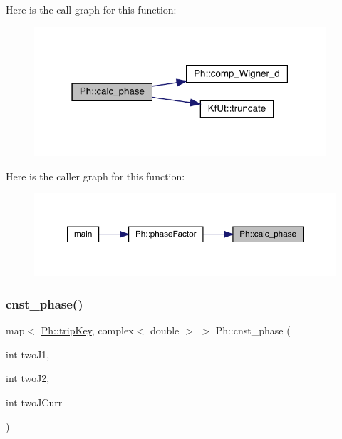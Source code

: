 Here is the call graph for this function\+:
\nopagebreak
\begin{figure}[H]
\begin{center}
\leavevmode
\includegraphics[width=307pt]{d6/d3c/namespacePh_a8662b8eefea46c114386b136878a461c_cgraph}
\end{center}
\end{figure}
Here is the caller graph for this function\+:
\nopagebreak
\begin{figure}[H]
\begin{center}
\leavevmode
\includegraphics[width=350pt]{d6/d3c/namespacePh_a8662b8eefea46c114386b136878a461c_icgraph}
\end{center}
\end{figure}
\mbox{\label{namespacePh_ac0bb2f4b2888c7c304cb6fcb1b5a7ce2}} 
\subsubsection{\texorpdfstring{cnst\_phase()}{cnst\_phase()}}
{\footnotesize\ttfamily map$<$ \mbox{\hyperlink{namespacePh_afdd5bf3d7b37625115089ea3048e0cbb}{Ph\+::trip\+Key}}, complex$<$ double $>$ $>$ Ph\+::cnst\+\_\+phase (\begin{DoxyParamCaption}\item[{int}]{two\+J1,  }\item[{int}]{two\+J2,  }\item[{int}]{two\+J\+Curr }\end{DoxyParamCaption})}

